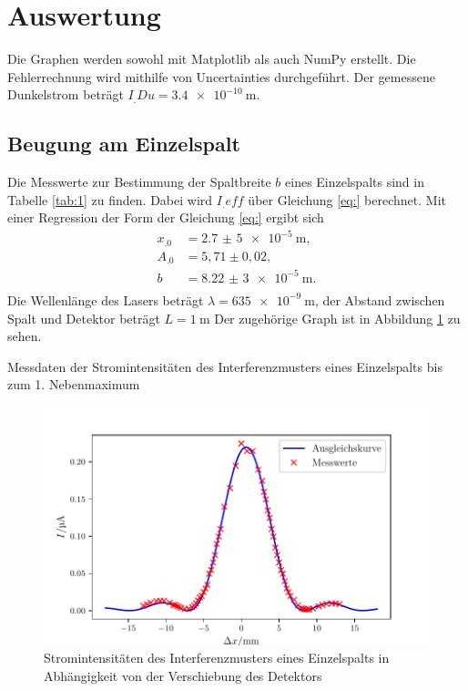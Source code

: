 \section{Auswertung}
\label{sec:Auswertung}


Die Graphen werden sowohl mit Matplotlib \cite{matplotlib} als auch NumPy \cite{numpy} erstellt. Die Fehlerrechnung wird mithilfe von Uncertainties \cite{uncertainties} 
durchgeführt.
\newline\newline
Der gemessene Dunkelstrom beträgt $I_.Du=\SI{3,4e-10}{\metre}$.
\subsection{Beugung am Einzelspalt}

Die Messwerte zur Bestimmung der Spaltbreite $b$ eines Einzelspalts sind in Tabelle \ref{tab:1} zu finden. Dabei wird $I_.eff$ über Gleichung \eqref{eq:} berechnet.
 Mit einer Regression der Form der Gleichung \eqref{eq:} ergibt sich
\begin{align*}
x_.0&= \SI{2,7(5)e-5}{\metre}\text{,} \\
A_.0&= 5,71 \pm 0,02\text{,} \\
b   &= \SI{8,22(3)e-5}{\metre}\text{.} \\
\end{align*}
Die Wellenlänge des Lasers beträgt $\lambda = \SI{635e-9}{\metre}$, der Abstand zwischen Spalt und Detektor beträgt $L=\SI{1}{\metre}$
Der zugehörige Graph ist in Abbildung \ref{fig:Einzel} zu sehen.

\begin{table}
\caption{Messdaten der Stromintensitäten des Interferenzmusters eines Einzelspalts bis zum 1. Nebenmaximum}


\label{tab:1}
\end{table}

\begin{figure}
\centering
\includegraphics[width=\linewidth-70pt,height=\textheight-70pt,keepaspectratio]{content/images/Einzelspalt.pdf}
\caption{Stromintensitäten des Interferenzmusters eines Einzelspalts in Abhängigkeit von der Verschiebung des Detektors}
\label{fig:Einzel}
\end{figure}

